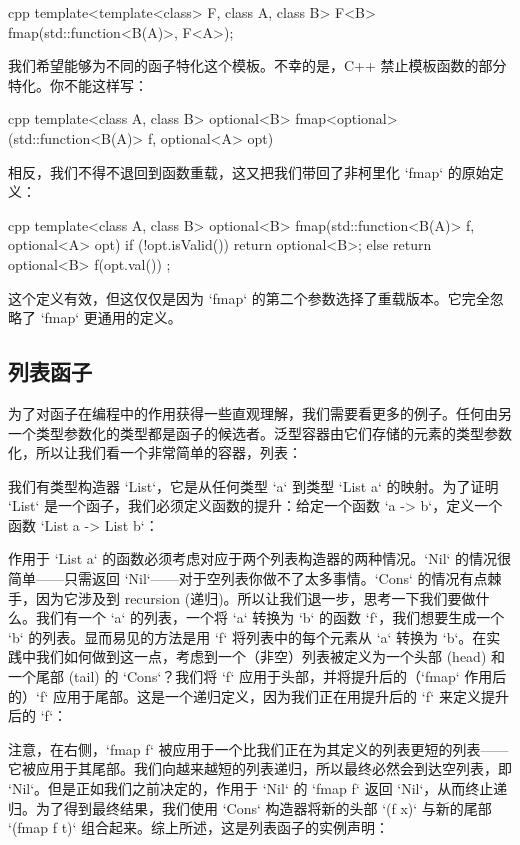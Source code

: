 \begin{snip}{cpp}
template<template<class> F, class A, class B>
F<B> fmap(std::function<B(A)>, F<A>);
\end{snip}
我们希望能够为不同的函子特化这个模板。不幸的是，C++ 禁止模板函数的部分特化。你不能这样写：

\begin{snip}{cpp}
template<class A, class B>
optional<B> fmap<optional>(std::function<B(A)> f, optional<A> opt)
\end{snip}
相反，我们不得不退回到函数重载，这又把我们带回了非柯里化 `fmap` 的原始定义：

\begin{snip}{cpp}
template<class A, class B>
optional<B> fmap(std::function<B(A)> f, optional<A> opt) {
    if (!opt.isValid())
        return optional<B>{};
    else
        return optional<B>{ f(opt.val()) };
}
\end{snip}
这个定义有效，但这仅仅是因为 `fmap` 的第二个参数选择了重载版本。它完全忽略了 `fmap` 更通用的定义。

\subsection{列表函子}

为了对函子在编程中的作用获得一些直观理解，我们需要看更多的例子。任何由另一个类型参数化的类型都是函子的候选者。泛型容器由它们存储的元素的类型参数化，所以让我们看一个非常简单的容器，列表：

我们有类型构造器 `List`，它是从任何类型 `a` 到类型 `List a` 的映射。为了证明 `List` 是一个函子，我们必须定义函数的提升：给定一个函数 `a -> b`，定义一个函数 `List a -> List b`：

作用于 `List a` 的函数必须考虑对应于两个列表构造器的两种情况。`Nil` 的情况很简单——只需返回 `Nil`——对于空列表你做不了太多事情。`Cons` 的情况有点棘手，因为它涉及到 recursion (递归)。所以让我们退一步，思考一下我们要做什么。我们有一个 `a` 的列表，一个将 `a` 转换为 `b` 的函数 `f`，我们想要生成一个 `b` 的列表。显而易见的方法是用 `f` 将列表中的每个元素从 `a` 转换为 `b`。在实践中我们如何做到这一点，考虑到一个（非空）列表被定义为一个头部 (head) 和一个尾部 (tail) 的 `Cons`？我们将 `f` 应用于头部，并将提升后的（`fmap` 作用后的）`f` 应用于尾部。这是一个递归定义，因为我们正在用提升后的 `f` 来定义提升后的 `f`：

注意，在右侧，`fmap f` 被应用于一个比我们正在为其定义的列表更短的列表——它被应用于其尾部。我们向越来越短的列表递归，所以最终必然会到达空列表，即 `Nil`。但是正如我们之前决定的，作用于 `Nil` 的 `fmap f` 返回 `Nil`，从而终止递归。为了得到最终结果，我们使用 `Cons` 构造器将新的头部 `(f x)` 与新的尾部 `(fmap f t)` 组合起来。综上所述，这是列表函子的实例声明：

